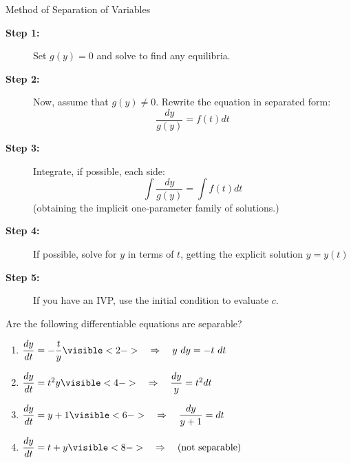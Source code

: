 \documentclass{beamer}
\begin{document}
\begin{frame}
\begin{block}{Method of Separation of Variables}
\begin{description}
\item[\textbf{Step 1:}] Set $g(y)=0$ and solve to find any equilibria.
\item[\textbf{Step 2:}] Now, assume that $g(y)\neq 0$\@. Rewrite the equation in separated form:
\begin{equation*}
\dfrac{dy}{g(y)} = f(t)dt
\end{equation*}
\item[\textbf{Step 3:}] Integrate, if possible, each side:
\begin{equation*}
\int\dfrac{dy}{g(y)} = \int f(t)dt
\end{equation*}
(obtaining the implicit one-parameter family of solutions.)
\item[\textbf{Step 4:}] If possible, solve for $y$ in terms of $t$, getting the explicit solution $y=y(t)$
\item[\textbf{Step 5:}] If you have an IVP, use the initial condition to evaluate $c$\@.
\end{description}
\end{block}
\end{frame}

\begin{frame}
\begin{example}
Are the following differentiable equations are separable?
\begin{enumerate}
\item<1-> $\dfrac{dy}{dt}=-\dfrac{t}{y}
\visible<2->{\quad\Rightarrow\quad y~dy = -t~dt}$
\item<3-> $\dfrac{dy}{dt}=t^2y
\visible<4->{\quad\Rightarrow\quad \dfrac{dy}{y}= t^2dt}$
\item<5-> $\dfrac{dy}{dt}=y+1
\visible<6->{\quad\Rightarrow\quad \dfrac{dy}{y+1} = dt}$
\item<7-> $\dfrac{dy}{dt}=t+y
\visible<8->{\quad\Rightarrow\quad \text{(not separable)}}$
\end{enumerate}
\end{example}
\end{frame}
\end{document}
